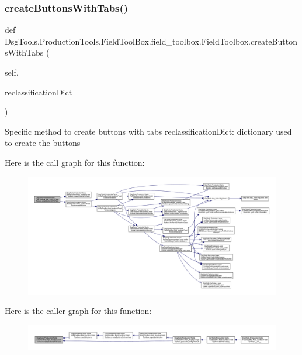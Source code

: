 \subsubsection{\texorpdfstring{create\+Buttons\+With\+Tabs()}{createButtonsWithTabs()}}
{\footnotesize\ttfamily def Dsg\+Tools.\+Production\+Tools.\+Field\+Tool\+Box.\+field\+\_\+toolbox.\+Field\+Toolbox.\+create\+Buttons\+With\+Tabs (\begin{DoxyParamCaption}\item[{}]{self,  }\item[{}]{reclassification\+Dict }\end{DoxyParamCaption})}

\begin{DoxyVerb}Specific method to create buttons with tabs
reclassificationDict: dictionary used to create the buttons
\end{DoxyVerb}
 Here is the call graph for this function\+:
\nopagebreak
\begin{figure}[H]
\begin{center}
\leavevmode
\includegraphics[width=350pt]{class_dsg_tools_1_1_production_tools_1_1_field_tool_box_1_1field__toolbox_1_1_field_toolbox_a889ff53bda2fc377700f108eef3a6cb6_cgraph}
\end{center}
\end{figure}
Here is the caller graph for this function\+:
\nopagebreak
\begin{figure}[H]
\begin{center}
\leavevmode
\includegraphics[width=350pt]{class_dsg_tools_1_1_production_tools_1_1_field_tool_box_1_1field__toolbox_1_1_field_toolbox_a889ff53bda2fc377700f108eef3a6cb6_icgraph}
\end{center}
\end{figure}
\mbox{\label{class_dsg_tools_1_1_production_tools_1_1_field_tool_box_1_1field__toolbox_1_1_field_toolbox_ad9cf78f69a8769cb434f93ca2e6f7c23}} 
